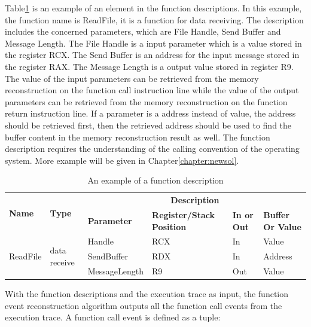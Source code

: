 Table\ref{functionexample} is an example of an element in the function descriptions. In this example, the function name is ReadFile, it is a function for data receiving. The description includes the concerned parameters, which are File Handle, Send Buffer and Message Length. The File Handle is a input parameter which is a value stored in the register RCX. The Send Buffer is an address for the input message stored in the register RAX. The Message Length is a output value stored in register R9. The value of the input parameters can be retrieved from the memory reconstruction on the function call instruction line while the value of the output parameters can be retrieved from the memory reconstruction on the function return instruction line. If a parameter is a address instead of value, the address should be retrieved first, then the retrieved address should be used to find the buffer content in the memory reconstruction result as well.  The function description requires the understanding of the calling convention of the operating system. More example will be given in Chapter\ref{chapter:newsol}.

\begin{table}[H]
        \centering
        \caption{An example of a function description}
        \label{functionexample}
        \begin{tabular}{|l|l|l|l|l|l|}
            \hline
             \multirow{2}{*}{{\textbf{Name}}} & \multirow{2}{*}{{\textbf{Type}}} & \multicolumn{4}{c|}{\textbf{Description}}  \\
              \cline{3-6} 
             & & \textbf{Parameter}& \textbf{Register/Stack Position}& \textbf{In or Out} &  \textbf{Buffer Or Value}  \\
             \hline
             \multirow{3}{*}{ReadFile}
             &\multirow{3}{*}{data receive} &  Handle & RCX & In & Value\\
              \cline{3-6} 
             & & SendBuffer & RDX & In & Address\\
              \cline{3-6} 
             & & MessageLength & R9 & Out & Value\\
            \hline            
        \end{tabular}
    \end{table}

With the function descriptions and the execution trace as input, the function event reconstruction algorithm outputs all the function call events from the execution trace. A function call event is defined as a tuple:

